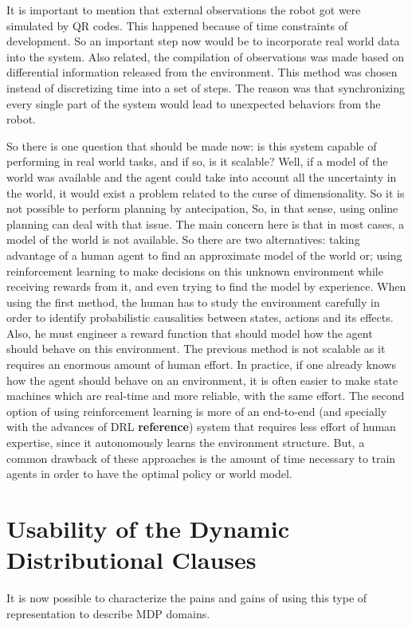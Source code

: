 It is important to mention that external observations the robot got were
simulated by QR codes. This happened because of time constraints of development.
So an important step now would be to incorporate real world data into the
system. Also related, the compilation of observations was made based on
differential information released from the environment. This method was chosen
instead of discretizing time into a set of steps. The reason was that
synchronizing every single part of the system would lead to unexpected behaviors
from the robot.

So there is one question that should be made now: is this system capable of
performing in real world tasks, and if so, is it scalable?
Well, if a model of the world was available and the agent could take
into account all the uncertainty in the world, it would exist a problem related
to the curse of dimensionality. So it is not possible to perform planning by
antecipation, So, in that sense, using online planning can deal with that issue.
The main concern here is that in most cases, a model of the world is not
available. So there are two alternatives: taking advantage of a human agent to
find an approximate model of the world or; using reinforcement learning to make
decisions on this unknown environment while receiving rewards from it, and even
trying to find the model by experience.
When using the first method, the human has to study the environment carefully in
order to identify probabilistic causalities between states, actions and its
effects. Also, he must engineer a reward function that should model how the agent
should behave on this environment. The previous method is not scalable as it
requires an enormous amount of human effort. In practice, if one already knows
how the agent should behave on an environment, it is often easier to make state
machines which are real-time and more reliable, with the same effort.
The second option of using reinforcement learning is more of an end-to-end (and
specially with the advances of DRL \textbf{reference})
system that requires less effort of human expertise, since it autonomously
learns the environment structure. But, a common drawback of these approaches is
the amount of time necessary to train agents in order to have the optimal policy
or world model.

\section{Usability of the Dynamic Distributional Clauses}
It is now possible to characterize the pains and gains of using this type of
representation to describe \gls{MDP} domains.

